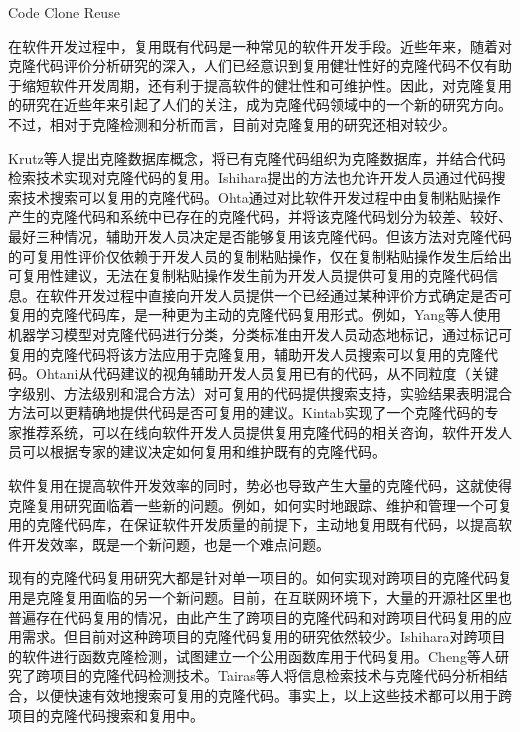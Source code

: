 {Code Clone Reuse}

在软件开发过程中，复用既有代码是一种常见的软件开发手段。近些年来，随着对克隆代码评价分析研究的深入，人们已经意识到复用健壮性好的克隆代码不仅有助于缩短软件开发周期，还有利于提高软件的健壮性和可维护性。因此，对克隆复用的研究在近些年来引起了人们的关注，成为克隆代码领域中的一个新的研究方向。不过，相对于克隆检测和分析而言，目前对克隆复用的研究还相对较少。

Krutz等人提出克隆数据库概念，将已有克隆代码组织为克隆数据库，并结合代码检索技术实现对克隆代码的复用\cite{krutz2014code}。Ishihara提出的方法也允许开发人员通过代码搜索技术搜索可以复用的克隆代码\cite{ishihara2013reusing}。Ohta通过对比软件开发过程中由复制粘贴操作产生的克隆代码和系统中已存在的克隆代码，并将该克隆代码划分为较差、较好、最好三种情况，辅助开发人员决定是否能够复用该克隆代码\cite{ohta2015source}。但该方法对克隆代码的可复用性评价仅依赖于开发人员的复制粘贴操作，仅在复制粘贴操作发生后给出可复用性建议，无法在复制粘贴操作发生前为开发人员提供可复用的克隆代码信息。在软件开发过程中直接向开发人员提供一个已经通过某种评价方式确定是否可复用的克隆代码库，是一种更为主动的克隆代码复用形式。例如，Yang\cite{yang2015classification}等人使用机器学习模型对克隆代码进行分类，分类标准由开发人员动态地标记，通过标记可复用的克隆代码将该方法应用于克隆复用，辅助开发人员搜索可以复用的克隆代码。Ohtani从代码建议的视角辅助开发人员复用已有的代码，从不同粒度（关键字级别、方法级别和混合方法）对可复用的代码提供搜索支持，实验结果表明混合方法可以更精确地提供代码是否可复用的建议\cite{ohtani2015level}。Kintab实现了一个克隆代码的专家推荐系统，可以在线向软件开发人员提供复用克隆代码的相关咨询，软件开发人员可以根据专家的建议决定如何复用和维护既有的克隆代码\cite{kintab2014recommending}。

软件复用在提高软件开发效率的同时，势必也导致产生大量的克隆代码，这就使得克隆复用研究面临着一些新的问题。例如，如何实时地跟踪、维护和管理一个可复用的克隆代码库，在保证软件开发质量的前提下，主动地复用既有代码，以提高软件开发效率，既是一个新问题，也是一个难点问题。

现有的克隆代码复用研究大都是针对单一项目的。如何实现对跨项目的克隆代码复用是克隆复用面临的另一个新问题。目前，在互联网环境下，大量的开源社区里也普遍存在代码复用的情况，由此产生了跨项目的克隆代码和对跨项目代码复用的应用需求。但目前对这种跨项目的克隆代码复用的研究依然较少。Ishihara对跨项目的软件进行函数克隆检测，试图建立一个公用函数库用于代码复用\cite{ishihara2012inter}。Cheng等人研究了跨项目的克隆代码检测技术\cite{cheng2016feasibility}。Tairas等人将信息检索技术与克隆代码分析相结合，以便快速有效地搜索可复用的克隆代码\cite{tairas2009information}。事实上，以上这些技术都可以用于跨项目的克隆代码搜索和复用中。

